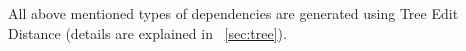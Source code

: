 All above mentioned types of dependencies 
are generated using Tree Edit Distance 
(details are explained in ~\ref{sec:tree}). 


%
%
%
%
%
%
%
%
%

